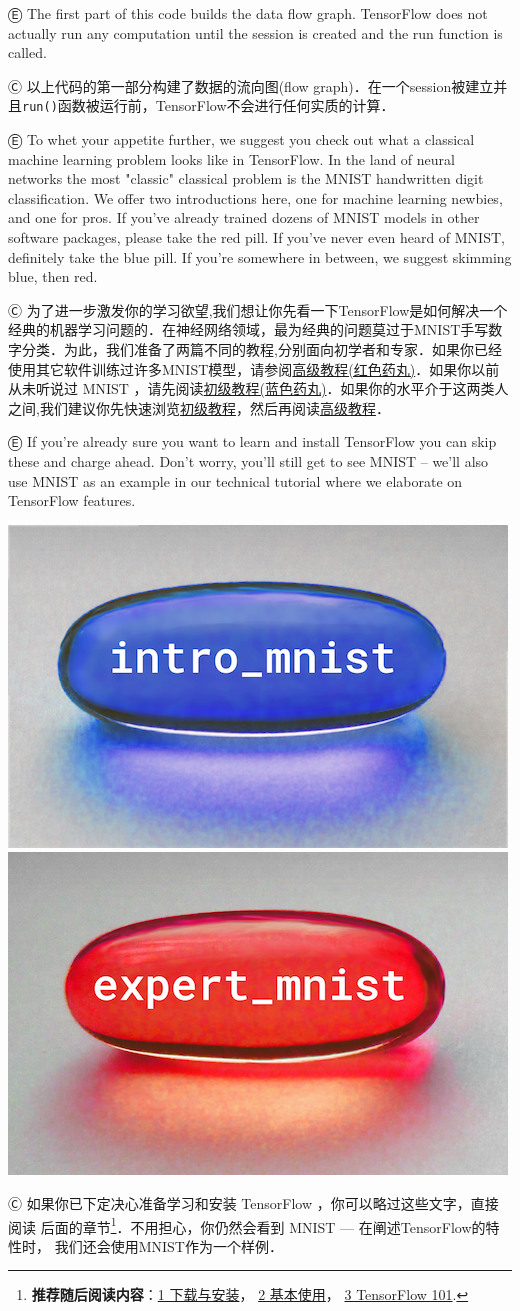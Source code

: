 Ⓔ \textcolor{etc}{The first part of this code builds the data flow graph. TensorFlow does not actually run any computation until the session is created and the run function is called.}

Ⓒ 以上代码的第一部分构建了数据的流向图(flow graph)．在一个session被建立并且\lstinline{run()}函数被运行前，TensorFlow不会进行任何实质的计算．

Ⓔ \textcolor{etc}{To whet your appetite further, we suggest you check out what a classical machine learning problem looks like in TensorFlow. In the land of neural networks the most "classic" classical problem is the MNIST handwritten digit classification. We offer two introductions here, one for machine learning newbies, and one for pros. If you've already trained dozens of MNIST models in other software packages, please take the red pill. If you've never even heard of MNIST, definitely take the blue pill. If you're somewhere in between, we suggest skimming blue, then red.}

Ⓒ 为了进一步激发你的学习欲望,我们想让你先看一下TensorFlow是如何解决一个经典的机器学习问题的．在神经网络领域，最为经典的问题莫过于MNIST手写数字分类．为此，我们准备了两篇不同的教程,分别面向初学者和专家．如果你已经使用其它软件训练过许多MNIST模型，请参阅\hyperref[MINIST_pros]{高级教程(红色药丸)}．如果你以前从未听说过 MNIST ，请先阅读\hyperref[MINIST_beginner]{初级教程(蓝色药丸)}．如果你的水平介于这两类人之间,我们建议你先快速浏览\hyperref[MINIST_beginner]{初级教程}，然后再阅读\hyperref[MINIST_pros]{高级教程}．


Ⓔ \textcolor{etc}{If you're already sure you want to learn and install TensorFlow you can skip these and charge ahead. Don't worry, you'll still get to see MNIST -- we'll also use MNIST as an example in our technical tutorial where we elaborate on TensorFlow features.}

\begin{center}
\includegraphics[width=.45\textwidth]{../SOURCE/images/blue_pill.png}
\includegraphics[width=.45\textwidth]{../SOURCE/images/red_pill.png}
\end{center}

Ⓒ 如果你已下定决心准备学习和安装 TensorFlow ，你可以略过这些文字，直接阅读
后面的章节\footnote{\textbf{推荐随后阅读内容}：\hyperref[download_install]{1 下载与安装}， \hyperref[basic_usage]{2 基本使用}， \hyperref[tf_mech101]{3 TensorFlow 101}.}．不用担心，你仍然会看到 MNIST --- 在阐述TensorFlow的特性时，
我们还会使用MNIST作为一个样例．
